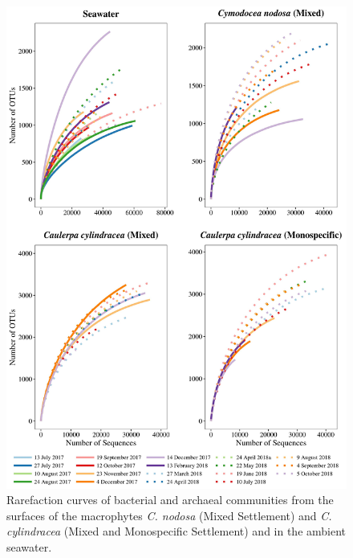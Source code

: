 \documentclass[12pt,]{article}
\begin{document}
\begin{figure}[H]

{\centering \includegraphics[width=0.85\linewidth]{../results/figures/rarefaction} 

}

\caption{Rarefaction curves of bacterial and archaeal communities from the surfaces of the macrophytes \textit{C. nodosa} (Mixed Settlement) and \textit{C. cylindracea} (Mixed and Monospecific Settlement) and in the ambient seawater.\label{rarefaction}}\label{fig:unnamed-chunk-1}
\end{figure}
\end{document}
